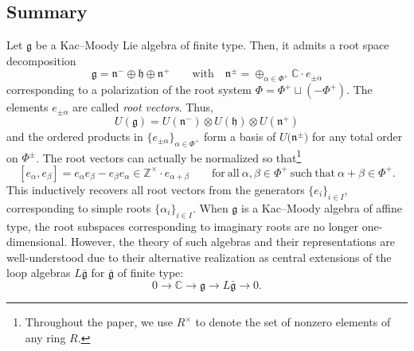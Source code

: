 \documentclass[pdftex]{sigma}
\numberwithin{equation}{section}
\newcommand{\fg}{\mathfrak{g}}
\newcommand{\fn}{\mathfrak{n}}
\newcommand{\fh}{\mathfrak{h}}
\newcommand{\BZ}{\mathbb{Z}}
\newcommand{\BC}{\mathbb{C}}
\begin{document}
\subsection{Summary}%

Let $\fg$ be a Kac--Moody Lie algebra of finite type. Then, it admits a root space decomposition
\[
\fg=\fn^- \oplus \fh \oplus \fn^+ \qquad \text{with}\quad \fn^{\pm}=\oplus_{\alpha\in \Phi^+} \BC\cdot e_{\pm \alpha}
\]
 corresponding to a polarization of the root system $\Phi=\Phi^+ \sqcup (-\Phi^+)$. The elements $e_{\pm \alpha}$ are called \textit{root vectors}. Thus,
 \[
 U(\fg)=U(\fn^-) \otimes U(\fh) \otimes U(\fn^+)
 \]
 and the ordered products in $\{e_{\pm \alpha}\}_{\alpha\in \Phi^+}$ form a basis of $U\bigl(\fn^\pm\bigr)$ for any total order on $\Phi^\pm$. The root vectors can actually be normalized so that\footnote{Throughout the paper, we use $R^\times$ to denote the set of nonzero elements of any ring $R$.}
\begin{equation}\label{eqn:Lie-root-vectors}
 [e_{\alpha},e_{\beta}] = e_{\alpha}e_{\beta}-e_{\beta}e_{\alpha} \in \BZ^\times \cdot e_{\alpha+\beta}
 \qquad \mathrm{for\ all} \ \alpha, \beta \in \Phi^+ \ \mathrm{such\ that} \ \alpha+\beta \in \Phi^+.
\end{equation}
This inductively recovers all root vectors from the generators $\{e_i\}_{i\in I}$, corresponding to simple roots $\{\alpha_i\}_{i\in I}$. When $\fg$ is a Kac--Moody algebra of affine type, the root subspaces corresponding to imaginary roots are no longer one-dimensional. However, the theory of such algebras and their representations are well-understood due to their alternative realization as central extensions of the loop algebras $L\bar{\fg}$ for $\bar{\fg}$ of finite type:
\begin{equation}\label{eq:affLie-loop}
 0\to \BC \to \fg\to L\bar{\fg}\to 0.
\end{equation}
\end{document}
